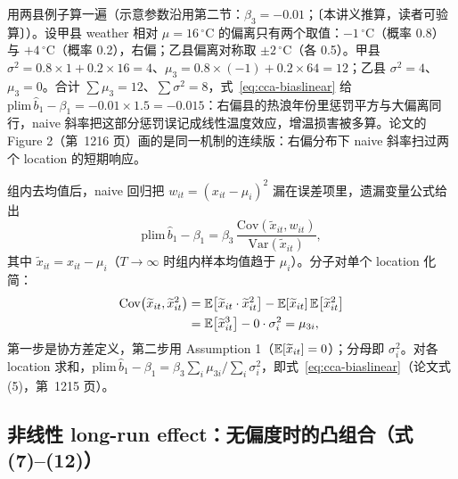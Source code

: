 用两县例子算一遍（示意参数沿用第二节：$\beta_3=-0.01$；〔本讲义推算，读者可验算〕）。设甲县 weather 相对 $\mu=16\,^\circ$C 的偏离只有两个取值：$-1\,^\circ$C（概率 0.8）与 $+4\,^\circ$C（概率 0.2），右偏；乙县偏离对称取 $\pm2\,^\circ$C（各 0.5）。甲县 $\sigma^2=0.8\times1+0.2\times16=4$、$\mu_3=0.8\times(-1)+0.2\times64=12$；乙县 $\sigma^2=4$、$\mu_3=0$。合计 $\sum\mu_3=12$、$\sum\sigma^2=8$，式~\ref{eq:cca-biaslinear} 给 $\mathrm{plim}\,\widehat{b}_1-\beta_1=-0.01\times1.5=-0.015$：右偏县的热浪年份里惩罚平方与大偏离同行，naive 斜率把这部分惩罚误记成线性温度效应，增温损害被多算。论文的 Figure 2（第~1216 页）画的是同一机制的连续版：右偏分布下 naive 斜率扫过两个 location 的短期响应。

\begin{intuition}
组内去均值后，naive 回归把 $w_{it}=(x_{it}-\mu_i)^2$ 漏在误差项里，遗漏变量公式给出
\begin{equation}
\mathrm{plim}\,\widehat{b}_1-\beta_1=\beta_3\,\frac{\mathrm{Cov}(\widetilde{x}_{it},w_{it})}{\mathrm{Var}(\widetilde{x}_{it})},
\label{eq:cca-ovb}
\end{equation}
其中 $\widetilde{x}_{it}=x_{it}-\mu_i$（$T\to\infty$ 时组内样本均值趋于 $\mu_i$）。分子对单个 location 化简：
\begin{align}
\mathrm{Cov}\bigl(\widetilde{x}_{it},\widetilde{x}_{it}^{2}\bigr)
&=\mathbb{E}\bigl[\widetilde{x}_{it}\cdot\widetilde{x}_{it}^{2}\bigr]-\mathbb{E}[\widetilde{x}_{it}]\,\mathbb{E}\bigl[\widetilde{x}_{it}^{2}\bigr] \notag\\
&=\mathbb{E}\bigl[\widetilde{x}_{it}^{3}\bigr]-0\cdot\sigma_i^2
=\mu_{3i},
\label{eq:cca-moment}
\end{align}
第一步是协方差定义，第二步用 Assumption 1（$\mathbb{E}[\widetilde{x}_{it}]=0$）；分母即 $\sigma_i^2$。对各 location 求和，$\mathrm{plim}\,\widehat{b}_1-\beta_1=\beta_3\sum_i\mu_{3i}\big/\sum_i\sigma_i^2$，即式~\ref{eq:cca-biaslinear}（论文式 (5)，第~1215 页）。
\end{intuition}

\subsection{非线性 long-run effect：无偏度时的凸组合（式 (7)--(12)）}

